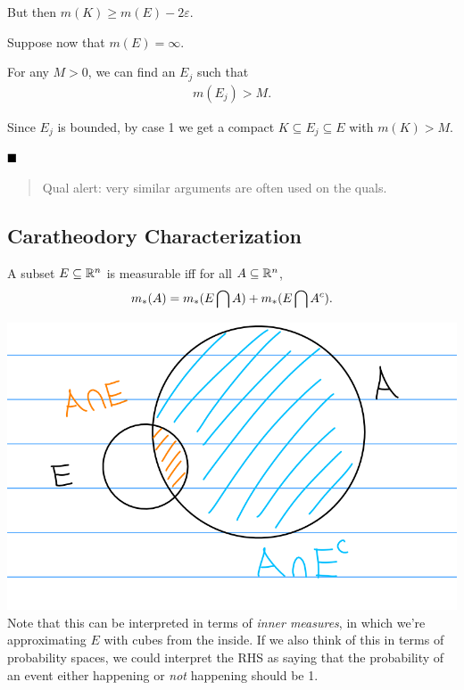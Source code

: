 But then \(m(K) \geq m(E) - 2\varepsilon\).

Suppose now that \(m(E) = \infty\).

For any \(M > 0\), we can find an \(E_j\) such that
\begin{align*}m(E_j) > M.\end{align*}

Since \(E_j\) is bounded, by case 1 we get a compact
\(K \subseteq E_j \subseteq E\) with \(m(K) > M\).

\(\qed\)

\begin{quote}
Qual alert: very similar arguments are often used on the quals.
\end{quote}

\hypertarget{caratheodory-characterization}{%
\subsection{Caratheodory
Characterization}\label{caratheodory-characterization}}

A subset \(E\subseteq {\mathbb{R}}^n\) is measurable iff for all
\(A\subseteq {\mathbb{R}}^n\),
\begin{align*}
m_*(A) = m_*(E\bigcap A) + m_*(E \bigcap A^c).
\end{align*}

\includegraphics{figures/2019-09-05-12:01.png}\\

Note that this can be interpreted in terms of \emph{inner measures}, in
which we're approximating \(E\) with cubes from the inside. If we also
think of this in terms of probability spaces, we could interpret the RHS
as saying that the probability of an event either happening or
\emph{not} happening should be 1.

